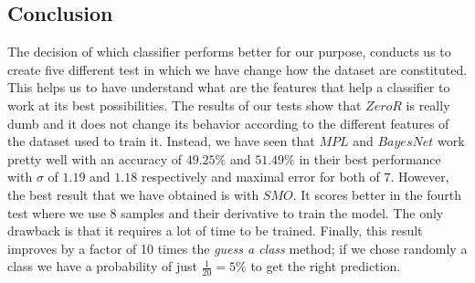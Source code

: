 \documentclass[12pt]{article}
\begin{document}
\subsection{Conclusion} 
The decision of which classifier performs better for our purpose, conducts us to create five different test in which we have change how the dataset are constituted.
This helps us to have understand what are the features that help a classifier to work at its best possibilities.
The results of our tests show that $ZeroR$ is really dumb and it does not change its behavior according to the different features of the dataset used to train it.
Instead, we have seen that $MPL$ and $BayesNet$ work pretty well with an accuracy of $49.25\%$ and $51.49\%$ in their best performance with $\sigma$ of $1.19$ and $1.18$ respectively and maximal error for both of $7$.
However, the best result that we have obtained is with $SMO$. 
It scores better in the fourth test where we use $8$ samples and their derivative to train the model. 
The only drawback is that it requires a lot of time to be trained.
Finally, this result improves by a factor of 10 times the \textit{guess a class} method; if we chose randomly a class we have a probability of just $\frac{1}{20} = 5\%$ to get the right prediction.


\printbibliography 

	
\end{document}
